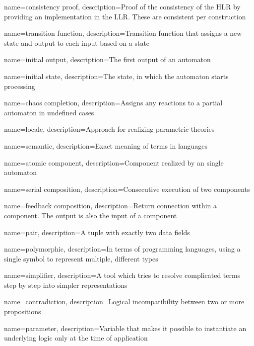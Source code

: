 {
    name={consistency proof},
    description={Proof of the consistency of the HLR by providing an implementation in the LLR. These are consistent per construction}
}

{
    name={transition function},
    description={Transition function that assigns a new state and output to each input based on a state}
}

{
    name={initial output},
    description={The first output of an automaton}
}

{
    name={initial state},
    description={The state, in which the automaton starts processing}
}

{
    name={chaos completion},
    description={Assigns any reactions to a partial automaton in undefined cases}
}

{
    name={locale},
    description={Approach for realizing parametric theories}
}

{
    name={semantic},
    description={Exact meaning of terms in languages}
}

{
    name={atomic component},
    description={Component realized by an single automaton}
}

{
    name={serial composition},
    description={Consecutive execution of two components}
}

{
    name={feedback composition},
    description={Return connection within a component. The output is also the input of a component}
}

{
    name={pair},
    description={A tuple with exactly two data fields}
}

{
    name={polymorphic},
    description={In terms of programming languages, using a single symbol to represent multiple, different types}
}

{
    name={simplifier},
    description={A tool which tries to resolve complicated terms step by step into simpler representations}
}


{
    name={contradiction},
    description={Logical incompatibility between two or more propositions}
}

{
    name={parameter},
    description={Variable that makes it possible to instantiate an underlying logic only at the time of application}
}


